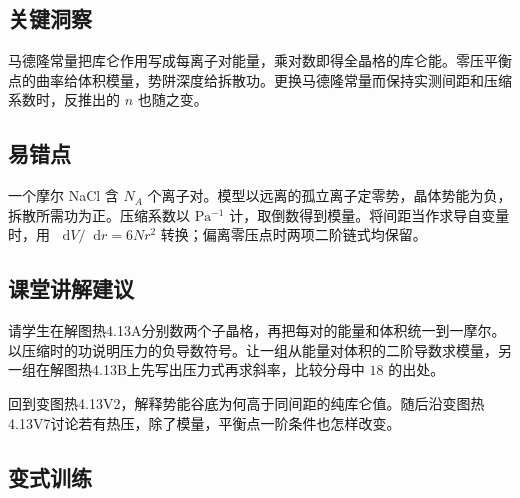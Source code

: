 \documentclass[UTF8,fontset=fandol,a4paper,11pt]{ctexart}
\newcommand{\dd}{\mathop{}\!\mathrm{d}}
\begin{document}


\subsection*{关键洞察}

马德隆常量把库仑作用写成每离子对能量，乘对数即得全晶格的库仑能。零压平衡点的曲率给体积模量，势阱深度给拆散功。更换马德隆常量而保持实测间距和压缩系数时，反推出的 $n$ 也随之变。



\subsection*{易错点}

一个摩尔 NaCl 含 $N_A$ 个离子对。模型以远离的孤立离子定零势，晶体势能为负，拆散所需功为正。压缩系数以 $\mathrm{Pa^{-1}}$ 计，取倒数得到模量。将间距当作求导自变量时，用 $\dd V/\dd r=6Nr^2$ 转换；偏离零压点时两项二阶链式均保留。



\subsection*{课堂讲解建议}

请学生在解图热4.13A分别数两个子晶格，再把每对的能量和体积统一到一摩尔。以压缩时的功说明压力的负导数符号。让一组从能量对体积的二阶导数求模量，另一组在解图热4.13B上先写出压力式再求斜率，比较分母中 $18$ 的出处。

回到变图热4.13V2，解释势能谷底为何高于同间距的纯库仑值。随后沿变图热4.13V7讨论若有热压，除了模量，平衡点一阶条件也怎样改变。



\subsection*{变式训练}
\end{document}
